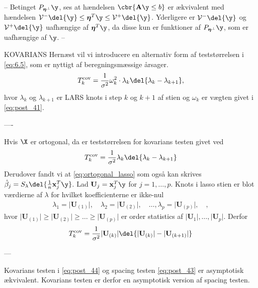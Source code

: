 --
Betinget \(P_{\boldsymbol{\eta}^\perp} \y\), ses at hændelsen \(\cbr{\mathbf{A} \y \leq b}\) er ækvivalent med hændelsen \(\mathcal{V}^- \del{\y} \leq \boldsymbol{\eta}^T \y \leq \mathcal{V}^+ \del{\y}\). Yderligere er \(\mathcal{V}^- \del{\y}\) og \(\mathcal{V}^+ \del{\y}\) uafhængige af \(\boldsymbol{\eta}^T \y\), da disse kun er funktioner af \(P_{\boldsymbol{\eta}^\perp} \y\), som er uafhængige af \(\y\).
--


KOVARIANS
Hernæst vil vi introducere en alternativ form af teststørrelsen i \eqref{eq:6.5}, som er nyttigt af beregningsmæssige årsager.
\begin{align*}
T_k^\text{cov} = \frac{1}{\sigma^2} \omega_k^2 \cdot \lambda_k \del{\lambda_k - \lambda_{k+1}},
\end{align*}
hvor \(\lambda_k\) og \(\lambda_{k+1}\) er LARS knots i step \(k\) og \(k+1\) af stien og \(\omega_k\) er vægten givet i \eqref{eq:post_41}.

----

Hvis \(\X\) er ortogonal, da er teststørrelsen for kovarians testen givet ved
\begin{align*}
T_k^\text{cov} = \frac{1}{\sigma^2} \lambda_k \del{\lambda_k - \lambda_{k+1}}
\end{align*} 
Derudover fandt vi at \eqref{eq:ortogonal_lasso} som også kan skrives \(\hat{\beta}_j = S_\lambda \del{\frac{1}{n} \mathbf{x}_j^T \y}\).
Lad \(\mathbf{U}_j = \mathbf{x}_j^T \y\) for \(j=1,\ldots, p\). 
Knots i lasso stien er blot værdierne af \(\lambda\) for hvilket koefficienterne er ikke-nul
\begin{align*}
\lambda_1 = \vert \mathbf{U}_{(1)} \vert, \quad \lambda_2 = \vert \mathbf{U}_{(2)} \vert, \quad \ldots, \lambda_p = \vert \mathbf{U}_{(p)} \vert, \quad,
\end{align*}
hvor \(\vert \mathbf{U}_{(1)} \vert \geq \vert \mathbf{U}_{(2)} \vert \geq \dots \geq \vert \mathbf{U}_{(p)} \vert\) er order statistics af \(\vert \mathbf{U}_1 \vert, \ldots, \vert \mathbf{U}_p \vert\).
Derfor 
\begin{align*}
T_k^\text{cov} = \frac{1}{\sigma^2}  \vert \mathbf{U}_{(k)} \vert \del{ \vert \mathbf{U}_{(k)} \vert -  \vert \mathbf{U}_{(k+1)} \vert}
\end{align*}

---

Kovarians testen i \eqref{eq:post_44} og spacing testen \eqref{eq:post_43} er asymptotisk ækvivalent.
Kovarians testen er derfor en asymptotisk version af spacing testen.

